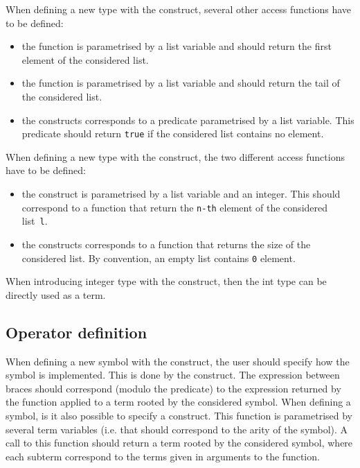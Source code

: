 \noindent
When defining a new type with the  construct,
several other access functions have to be defined:
\begin{itemize}
\item the  function is parametrised by a list
  variable and should return the first element of the considered list.

\item the  function is parametrised by a list
  variable and should return the tail of the considered list.

\item the  constructs corresponds to a
  predicate parametrised by a list variable.
  This predicate should return \texttt{true} if the considered list
  contains no element.
\end{itemize}

\noindent
When defining a new type with the  construct,
the two different access functions have to be defined:
\begin{itemize}
\item the  construct is parametrised by a list
  variable and an integer. This should correspond to a function that
  return the \texttt{n-th} element of the considered list~\texttt{l}.

\item the  constructs corresponds to a function
  that returns the size of the considered list.
  By convention, an empty list contains \texttt{0} element.
\end{itemize}

\noindent\label{int}
When introducing integer type with the  construct, then
the int type can be directly used as a term.

\subsection{Operator definition}\label{opdef}

\noindent
When defining a new symbol with the  construct, the user
should specify how the symbol is implemented. This is done by the
 construct.\label{fsym}
The expression between braces should correspond (modulo the
 predicate) to the expression returned by the
function  applied to a term rooted by the
considered symbol.  
\label{make}When defining a symbol, is it also possible to specify a
 construct. This function is parametrised by several 
term variables (i.e. that should correspond to the arity of the
symbol). A call to this  function should return a term
rooted by the considered symbol, where each subterm correspond to the
terms given in arguments to the function.

